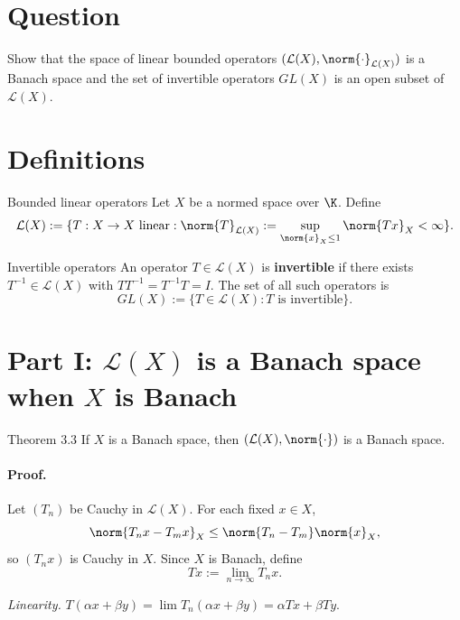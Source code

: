 \documentclass[11pt]{article}
\begin{document}

\section{Question}

Show that the space of linear bounded operators $(\mathcal L(X),\norm{\cdot}_{\mathcal L(X)})$ is a Banach space and the set of invertible operators $GL(X)$ is an open subset of $\mathcal L(X)$.

\section{Definitions}

\begin{defbox}{Bounded linear operators}
Let $X$ be a normed space over $\K$. Define
\[
\mathcal L(X):=\{T:X\to X \text{ linear} : \norm{T}_{\mathcal L(X)}:=\sup_{\norm{x}_X\le 1}\norm{Tx}_X<\infty\}.
\]
\end{defbox}

\begin{defbox}{Invertible operators}
An operator $T\in\mathcal L(X)$ is \textbf{invertible} if there exists $T^{-1}\in\mathcal L(X)$ with $TT^{-1}=T^{-1}T=I$. The set of all such operators is
\[
GL(X):=\{T\in\mathcal L(X):T\text{ is invertible}\}.
\]
\end{defbox}

\section{Part I: $\mathcal L(X)$ is a Banach space when $X$ is Banach}

\begin{thmbox}{Theorem 3.3}
If $X$ is a Banach space, then $(\mathcal L(X),\norm{\cdot})$ is a Banach space.
\end{thmbox}

\paragraph{Proof.}
Let $(T_n)$ be Cauchy in $\mathcal L(X)$. For each fixed $x\in X$,
\[
\norm{T_nx-T_mx}_X\le\norm{T_n-T_m}\norm{x}_X,
\]
so $(T_nx)$ is Cauchy in $X$. Since $X$ is Banach, define
\[
Tx:=\lim_{n\to\infty}T_nx.
\]

\emph{Linearity.} $T(\alpha x+\beta y)=\lim T_n(\alpha x+\beta y)=\alpha Tx+\beta Ty$.
\end{document}
